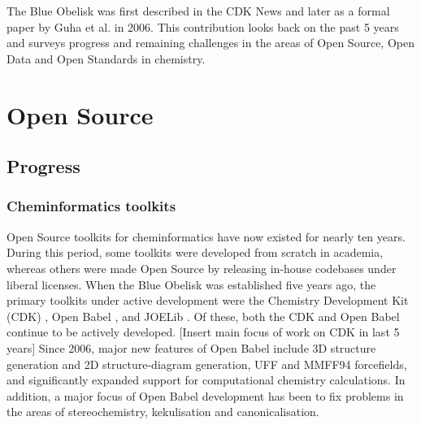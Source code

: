 \documentclass[10pt]{bmc_article}
\newenvironment{bmcformat}{\begin{raggedright}\baselineskip20pt\sloppy\setboolean{publ}{false}}{\end{raggedright}\baselineskip20pt\sloppy}
\begin{document}
\begin{bmcformat}
The Blue Obelisk was first described in the CDK News \cite{CDKNewsBO} and
later as a formal paper by Guha et al.\cite{Guha2006} in
2006. This
contribution looks back on the past 5 years and surveys progress and
remaining challenges in the areas of Open Source, Open Data and Open
Standards in chemistry.

\section*{Open Source}
  \subsection*{Progress}

\subsubsection*{Cheminformatics toolkits}

Open Source toolkits for cheminformatics have now existed for nearly
ten years. During this period, some toolkits were developed from
scratch in academia, whereas others were made Open Source by releasing in-house
codebases under liberal licenses. When the Blue Obelisk was
established five years ago, the primary toolkits under active development
were the Chemistry Development Kit (CDK)
\cite{Steinbeck2003, Steinbeck2006}, Open Babel \cite{WebOpenBabel},
and JOELib \cite{WebJOELib}. Of these, both the CDK and Open Babel
continue to be actively developed. [Insert main focus of work on CDK
in last 5 years] Since 2006, major new features of Open Babel include 3D structure
generation and 2D structure-diagram generation, UFF and MMFF94
forcefields, and significantly expanded support for computational
chemistry calculations. In addition, a major focus of Open Babel development
has been to fix problems in the areas of stereochemistry, kekulisation
and canonicalisation.


\end{bmcformat}
\end{document}

